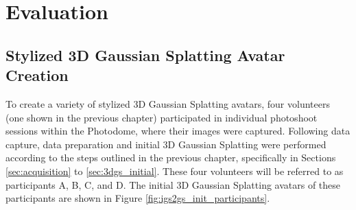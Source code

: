 \chapter{Evaluation}\label{chap:evaluation}

\section{Stylized 3D Gaussian Splatting Avatar Creation}

To create a variety of stylized 3D Gaussian Splatting avatars, four volunteers (one shown in the previous chapter) participated in individual photoshoot sessions within the Photodome, where their images were captured. Following data capture, data preparation and initial 3D Gaussian Splatting were performed according to the steps outlined in the previous chapter, specifically in Sections \ref{sec:acquisition} to \ref{sec:3dgs_initial}. These four volunteers will be referred to as participants A, B, C, and D. The initial 3D Gaussian Splatting avatars of these participants are shown in Figure \ref{fig:igs2gs_init_participants}.


